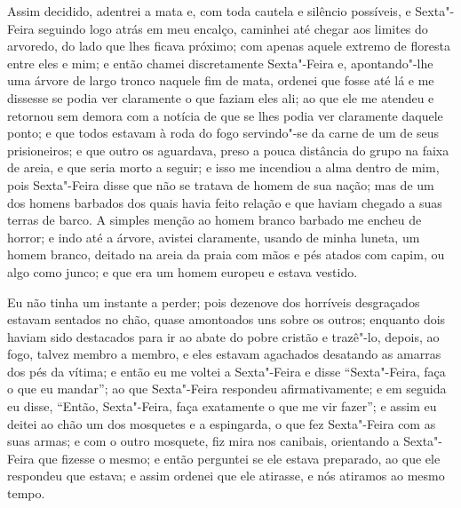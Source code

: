 Assim decidido, adentrei a mata e, com toda cautela e silêncio
possíveis, e Sexta"-Feira seguindo logo atrás em meu encalço, caminhei
até chegar aos limites do arvoredo, do lado que lhes ficava próximo; com
apenas aquele extremo de floresta entre eles e mim; e então chamei
discretamente Sexta"-Feira e, apontando"-lhe uma árvore de largo tronco
naquele fim de mata, ordenei que fosse até lá e me dissesse se podia ver
claramente o que faziam eles ali; ao que ele me atendeu e retornou sem
demora com a notícia de que se lhes podia ver claramente daquele ponto;
e que todos estavam à roda do fogo servindo"-se da carne de um de seus
prisioneiros; e que outro os aguardava, preso a pouca distância do grupo
na faixa de areia, e que seria morto a seguir; e isso me incendiou a
alma dentro de mim, pois Sexta"-Feira disse que não se tratava de homem
de sua nação; mas de um dos homens barbados dos quais havia feito
relação e que haviam chegado a suas terras de barco. A simples menção ao
homem branco barbado me encheu de horror; e indo até a árvore, avistei
claramente, usando de minha luneta, um homem branco, deitado na areia da
praia com mãos e pés atados com capim, ou algo como junco; e que era um
homem europeu e estava vestido.


Eu não tinha um instante a perder; pois dezenove dos horríveis
desgraçados estavam sentados no chão, quase amontoados uns sobre os
outros; enquanto dois haviam sido destacados para ir ao abate do pobre
cristão e trazê"-lo, depois, ao fogo, talvez membro a membro, e eles
estavam agachados desatando as amarras dos pés da vítima; e então eu me
voltei a Sexta"-Feira e disse ``Sexta"-Feira, faça o que eu mandar''; ao
que Sexta"-Feira respondeu afirmativamente; e em seguida eu disse,
``Então, Sexta"-Feira, faça exatamente o que me vir fazer''; e assim eu
deitei ao chão um dos mosquetes e a espingarda, o que fez Sexta"-Feira
com as suas armas; e com o outro mosquete, fiz mira nos canibais,
orientando a Sexta"-Feira que fizesse o mesmo; e então perguntei se ele
estava preparado, ao que ele respondeu que estava; e assim ordenei que
ele atirasse, e nós atiramos ao mesmo tempo.

